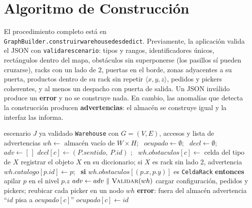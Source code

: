 \documentclass[11pt,a4paper]{article}
\theoremstyle{definition}
\newcommand{\sA}{\textsf{AMBOS}}
\begin{document}
\section{Algoritmo de Construcción}\label{sec:construccion}

El procedimiento completo está en \texttt{GraphBuilder.construir{}warehouse{}desde{}dict}. Previamente, la aplicación valida el JSON con \texttt{validar{}escenario}: tipos y rangos, identificadores únicos, rectángulos dentro del mapa, obstáculos sin superponerse (los pasillos sí pueden cruzarse), racks con un lado de 2, puertas en el borde, zonas adyacentes a su puerta, productos dentro de su rack sin repetir $\langle x,y,z\rangle$, pedidos y pickers coherentes, y al menos un despacho con puerta de salida. Un JSON inválido produce un \textbf{error} y no se construye nada. En cambio, las anomalías que detecta la construcción producen \textbf{advertencias}: el almacén se construye igual y la interfaz las informa.

\begin{algorithm}[H]
\caption{\textsc{Construir-Almacén}$(J)$}\label{alg:construir}
\begin{algorithmic}[1]
\Require escenario $J$ ya validado
\Ensure \texttt{Warehouse} con $G=(V,E)$, accesos y lista de advertencias
\State $wh\gets$ almacén vacío de $W\times H$; \ $ocupado\gets\emptyset$; \ $decl\gets\emptyset$; \ $adv\gets[\,]$
 
    \State {}
    \If{$decl[c]\neq\sA$} $decl[c]\gets(P.sentido,\ P.id)$ \EndIf \Comment{en un cruce, \sA{} prevalece}
  \EndFor
\EndFor
{} 
   ; \ $wh.obstaculos[c]\gets$ celda del tipo de $X$ \EndFor
  \State registrar el objeto $X$ en su diccionario; si $X$ es rack sin lado 2, advertencia
\EndFor
{} 
  \State $wh.catalogo[p.id]\gets p$; \ \textbf{si} $wh.obstaculos[(p.x,p.y)]$ es \texttt{CeldaRack} \textbf{entonces} apilar $p$ en el nivel $p.z$
\EndFor
\State {} 
\State $adv\gets adv\ \Vert\ \Call{Validar}{wh}$ 
\State cargar configuración, pedidos y pickers; reubicar cada picker en un nodo 
\State \Return $wh$
\Statex
{}
   \textbf{error}: fuera del almacén \EndIf
   advertencia ``$id$ pisa a $ocupado[c]$'' \EndIf
  \State $ocupado[c]\gets id$
\EndProcedure
\end{algorithmic}
\end{algorithm}
\end{document}
